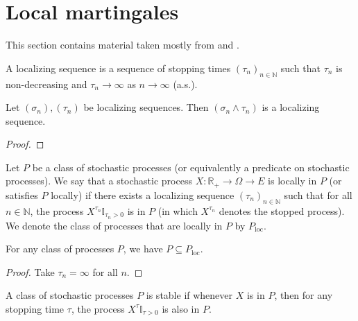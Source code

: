 \section{Local martingales}


This section contains material taken mostly from \cite[Chapters 10 and 18]{kallenberg2021} and \cite{almostsuremath}.


\begin{definition}\label{def:localizingSequence}
A localizing sequence is a sequence of stopping times $(\tau_n)_{n \in \mathbb{N}}$ such that $\tau_n$ is non-decreasing and $\tau_n \to \infty$ as $n \to \infty$ (a.s.).
\end{definition}


\begin{lemma}\label{lem:localizingSequence_min}
Let $(\sigma_n), (\tau_n)$ be localizing sequences.
Then $(\sigma_n \wedge \tau_n)$ is a localizing sequence.
\end{lemma}

\begin{proof}

\end{proof}


\begin{definition}\label{def:locally}
Let $P$ be a class of stochastic processes (or equivalently a predicate on stochastic processes).
We say that a stochastic process $X : \mathbb{R}_+ \to \Omega \to E$ is locally in $P$ (or satisfies $P$ locally) if there exists a localizing sequence $(\tau_n)_{n \in \mathbb{N}}$ such that for all $n \in \mathbb{N}$, the process $X^{\tau_n}\mathbb{I}_{\tau_n > 0}$ is in $P$ (in which $X^{\tau_n}$ denotes the stopped process).
We denote the class of processes that are locally in $P$ by $P_{\mathrm{loc}}$.
\end{definition}


\begin{lemma}\label{lem:implies_locally}
For any class of processes $P$, we have $P \subseteq P_{\mathrm{loc}}$.
\end{lemma}

\begin{proof}
Take $\tau_n = \infty$ for all $n$.
\end{proof}


\begin{definition}\label{def:stable}
A class of stochastic processes $P$ is stable if whenever $X$ is in $P$, then for any stopping time $\tau$, the process $X^{\tau}\mathbb{I}_{\tau > 0}$ is also in $P$.
\end{definition}


